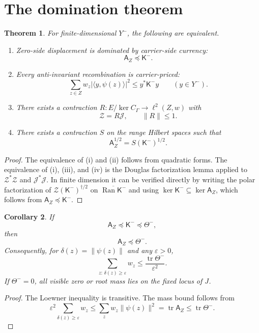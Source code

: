\documentclass[11pt]{article}
\newtheorem{theorem}{Theorem}[section]
\newtheorem{corollary}[theorem]{Corollary}
\DeclareMathOperator{\Ran}{Ran}
\DeclareMathOperator{\tr}{tr}
\newcommand{\Kmat}{\mathsf K}
\newcommand{\AZ}{\mathsf A_Z}
\begin{document}
\section{The domination theorem}
\begin{theorem}
For finite-dimensional $Y^-$, the following are equivalent.
\begin{enumerate}[label=(\roman*)]
  \item Zero-side displacement is dominated by carrier-side currency:
  \[
    \AZ\preceq \Kmat^- .
  \]
  \item Every anti-invariant recombination is carrier-priced:
  \[
    \sum_{z\in Z} w_z |\langle y,\psi(z)\rangle|^2
    \le
    y^*\Kmat^-y
    \qquad (y\in Y^-).
  \]
  \item There exists a contraction $R:E/\ker C_\Gamma\to \ell^2(Z,w)$ with
  \[
    \mathcal Z = R\mathcal J,
    \qquad \|R\|\le1 .
  \]
  \item There exists a contraction $S$ on the range Hilbert spaces such that
  \[
    \AZ^{1/2}=S(\Kmat^-)^{1/2} .
  \]
\end{enumerate}
\end{theorem}

\begin{proof}
The equivalence of (i) and (ii) follows from quadratic forms.  The equivalence of (i), (iii), and (iv) is the Douglas factorization lemma applied to $\mathcal Z^*\mathcal Z$ and $\mathcal J^*\mathcal J$.  In finite dimension it can be verified directly by writing the polar factorization of $\mathcal Z(\Kmat^-)^{\dagger/2}$ on $\overline{\Ran \Kmat^-}$ and using $\ker \Kmat^-\subseteq\ker \AZ$, which follows from $\AZ\preceq\Kmat^-$.\end{proof}

\begin{corollary}
If
\[
  \AZ\preceq\Kmat^-\preceq\Theta^- ,
\]
then
\[
  \AZ\preceq\Theta^- .
\]
Consequently, for $\delta(z)=\|\psi(z)\|$ and any $\varepsilon>0$,
\[
  \sum_{z:\,\delta(z)\ge\varepsilon} w_z
  \le
  \frac{\tr\Theta^-}{\varepsilon^2} .
\]
If $\Theta^-=0$, all visible zero or root mass lies on the fixed locus of $J$.
\end{corollary}

\begin{proof}
The Loewner inequality is transitive.  The mass bound follows from
\[
  \varepsilon^2\sum_{\delta(z)\ge\varepsilon} w_z
  \le \sum_z w_z\|\psi(z)\|^2
  =\tr\AZ\le\tr\Theta^- .
\]
\end{proof}
\end{document}
